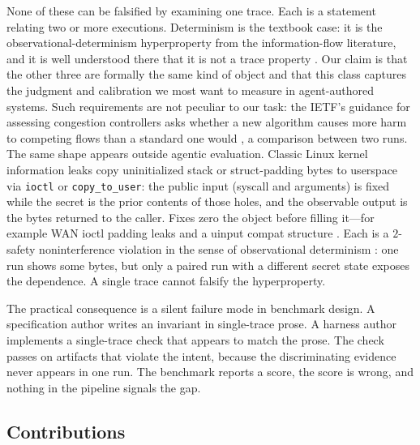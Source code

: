 \documentclass[conference]{IEEEtran}
\begin{document}
	None of these can be falsified by examining one trace. Each is a statement
	relating two or more executions. Determinism is the textbook case: it is
	the observational-determinism hyperproperty from the information-flow
	literature, and it is well understood there that it is not a trace property
	\cite{clarkson2010,zdancewic2003}. Our claim is that the other three are
	formally the same kind of object and that this class captures the
	judgment and calibration we most want to measure in agent-authored
	systems. Such requirements are not peculiar to our task: the IETF's
	guidance for assessing congestion controllers asks whether a new
	algorithm causes more harm to competing flows than a standard one
	would \cite{rfc9743}, a comparison between two runs.
	The same shape appears outside agentic evaluation. Classic Linux
	kernel information leaks copy uninitialized stack or struct-padding
	bytes to userspace via \texttt{ioctl} or \texttt{copy\_to\_user}: the
	public input (syscall and arguments) is fixed while the secret is the
	prior contents of those holes, and the observable output is the bytes
	returned to the caller. Fixes zero the object before filling it---for
	example WAN ioctl padding leaks
	\cite{linux-cve-2014-1444,linux-cve-2014-1445} and a uinput compat
	structure \cite{linux-cve-2025-40035}. Each is a $2$-safety
	noninterference violation in the sense of observational determinism
	\cite{clarkson2010,zdancewic2003}: one run shows some bytes, but only
	a paired run with a different secret state exposes the dependence.
	A single trace cannot falsify the hyperproperty.
	
	The practical consequence is a silent failure mode in benchmark design. A
	specification author writes an invariant in single-trace prose. A harness
	author implements a single-trace check that appears to match the prose. The
	check passes on artifacts that violate the intent, because the discriminating
	evidence never appears in one run. The benchmark reports a score, the score
	is wrong, and nothing in the pipeline signals the gap.
	
	\subsection{Contributions}
	
\end{document}
